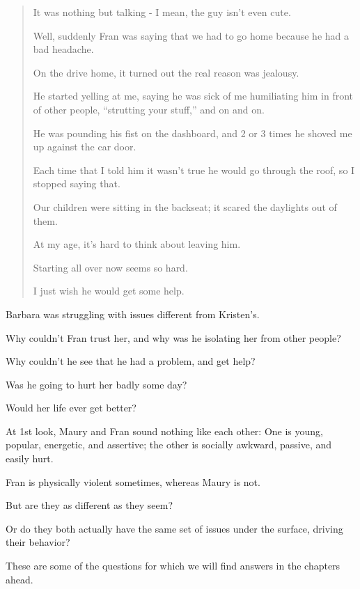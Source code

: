 \documentclass[oneside]{article}
\numberwithin{equation}{section}
\begin{document}
\begin{quotation}
    It was nothing but talking - I mean, the guy isn't even cute.
    
    Well, suddenly Fran was saying that we had to go home because he had a bad headache.
    
    On the drive home, it turned out the real reason was jealousy.
    
    He started yelling at me, saying he was sick of me humiliating him in front of other people, ``strutting your stuff,'' and on and on.
    
    He was pounding his fist on the dashboard, and 2 or 3 times he shoved me up against the car door.
    
    Each time that I told him it wasn't true he would go through the roof, so I stopped saying that.
    
    Our children were sitting in the backseat; it scared the daylights out of them.
    
    At my age, it's hard to think about leaving him.
    
    Starting all over now seems so hard.
    
    I just wish he would get some help.
\end{quotation}
Barbara was struggling with issues different from Kristen's.

Why couldn't Fran trust her, and why was he isolating her from other people?

Why couldn't he see that he had a problem, and get help?

Was he going to hurt her badly some day?

Would her life ever get better?

%
At 1st look, Maury and Fran sound nothing like each other: One is young, popular, energetic, and assertive; the other is socially awkward, passive, and easily hurt.

Fran is physically violent sometimes, whereas Maury is not.

But are they as different as they seem?

Or do they both actually have the same set of issues under the surface, driving their behavior?

These are some of the questions for which we will find answers in the chapters ahead.
\end{document}
